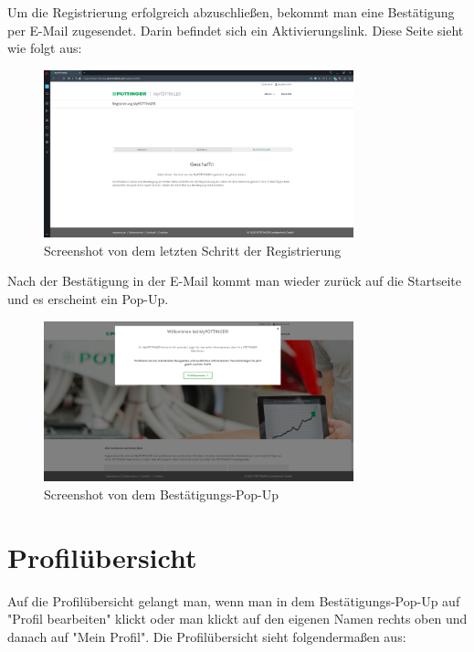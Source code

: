 Um die Registrierung erfolgreich abzuschließen, bekommt man eine Bestätigung per E-Mail zugesendet. Darin befindet sich ein Aktivierungslink. Diese Seite sieht wie folgt aus:

\begin{figure}[H]
	\centerline{
		\includegraphics[width=0.8\textwidth]{./grafiken/erm_register_4.png}
	}
	\vskip0pt
	\caption{Screenshot von dem letzten Schritt der Registrierung} \label{fig:step3register}
\end{figure}

Nach der Bestätigung in der E-Mail kommt man wieder zurück auf die Startseite und es erscheint ein Pop-Up.

\begin{figure}[H]
	\centerline{
		\includegraphics[width=0.8\textwidth]{./grafiken/erm_home_after_email.png}
	}
	\vskip0pt
	\caption{Screenshot von dem Bestätigungs-Pop-Up} \label{fig:popup}
\end{figure}

\section{Profilübersicht}

Auf die Profilübersicht gelangt man, wenn man in dem Bestätigungs-Pop-Up auf "Profil bearbeiten" klickt oder man klickt auf den eigenen Namen rechts oben und danach auf "Mein Profil". Die Profilübersicht sieht folgendermaßen aus:

